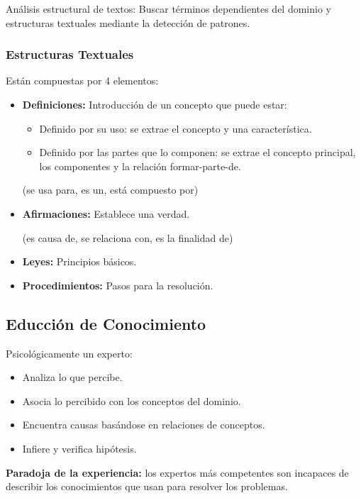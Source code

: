 \documentclass[12pt, twoside, openright]{report} %
\begin{document}
Análisis estructural de textos: Buscar términos dependientes del dominio y estructuras textuales mediante la detección de patrones.

\subsubsection{Estructuras Textuales}
Están compuestas por 4 elementos:
\begin{itemize}
	\item \textbf{Definiciones:} Introducción de un concepto que puede estar:
	      \begin{itemize}
		      \item Definido por su uso: se extrae el concepto y una característica.
		      \item Definido por las partes que lo componen: se extrae el concepto
		            principal, los componentes y la relación formar-parte-de.
	      \end{itemize}
	      (se usa para, es un, está compuesto por)
	\item \textbf{Afirmaciones:} Establece una verdad.

	      (es causa de, se relaciona con, es la finalidad de)
	\item \textbf{Leyes:} Principios básicos.
	\item \textbf{Procedimientos:} Pasos para la resolución.
\end{itemize}

\subsection{Educción de Conocimiento}
Psicológicamente un experto:
\begin{itemize}
	\item Analiza lo que percibe.
	\item Asocia lo percibido con los conceptos del dominio.
	\item Encuentra causas basándose en relaciones de conceptos.
	\item Infiere y verifica hipótesis.
\end{itemize}

\textbf{Paradoja de la experiencia:} los expertos más competentes son incapaces de describir los conocimientos que usan para resolver los problemas.
\end{document}
